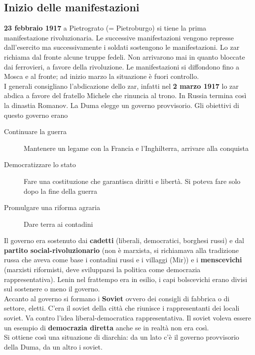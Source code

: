\subsection{Inizio delle manifestazioni}
\textbf{23 febbraio 1917} a Pietrograto (= Pietroburgo) si tiene la prima manifestazione 
rivoluzionaria. Le successive manifestazioni vengono represse dall'esercito ma successivamente i
soldati sostengono le manifestazioni. Lo zar richiama dal fronte alcune truppe fedeli. Non arrivarono
mai in quanto bloccate dai ferrovieri, a favore della rivoluzione. Le manifestazioni si diffondono
fino a Mosca e al fronte; ad inizio marzo la situazione è fuori controllo.\\
I generali consigliano l'abdicazione dello zar, infatti nel \textbf{2 marzo 1917} lo zar abdica a
favore del fratello Michele che rinuncia al trono. In Russia termina così la dinastia Romanov. La
Duma elegge un governo provvisorio. Gli obiettivi di questo governo erano
\begin{description}
  \item[Continuare la guerra] Mantenere un legame con la Francia e l'Inghilterra, arrivare alla
    conquista
  \item[Democratizzare lo stato] Fare una costituzione che garantisca diritti e libertà. Si poteva
    fare solo dopo la fine della guerra
  \item[Promulgare una riforma agraria] Dare terra ai contadini
\end{description}
Il governo era sostenuto dai \textbf{cadetti} (liberali, democratici, borghesi russi) e dal
\textbf{partito social-rivoluzionario} (non è marxista, si richiamava alla tradizione russa che aveva
come base i contadini russi e i villaggi (Mir)) e i \textbf{menscevichi} (marxisti riformisti,
deve svilupparsi la politica come democrazia rappresentativa). Lenin nel frattempo era in esilio,
i capi bolscevichi erano divisi sul sostenere o meno il governo.\\
Accanto al governo si formano i \textbf{Soviet} ovvero dei consigli di fabbrica o di settore, eletti.
C'era il soviet della città che riunisce i rappresentanti dei locali soviet. Va contro l'idea
liberal-democratica rappresentativa. Il soviet voleva essere un esempio di \textbf{democrazia
diretta} anche se in realtà non era così.\\
Si ottiene così una situazione di diarchia: da un lato c'è il governo provvisorio della Duma, da un
altro i soviet.

